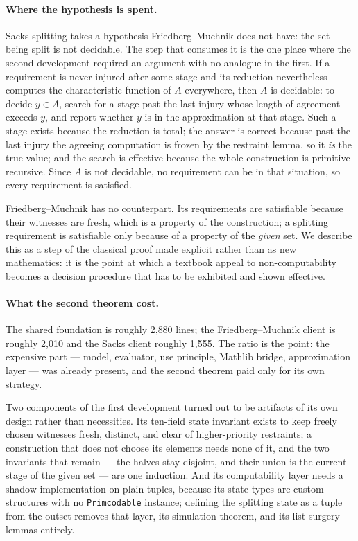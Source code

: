 \paragraph{Where the hypothesis is spent.}
Sacks splitting takes a hypothesis Friedberg--Muchnik does not have: the
set being split is not decidable.  The step that consumes it is the one
place where the second development required an argument with no analogue in
the first.  If a requirement is never injured after some stage and its
reduction nevertheless computes the characteristic function of $A$
everywhere, then $A$ is decidable: to decide $y \in A$, search for a stage
past the last injury whose length of agreement exceeds $y$, and report
whether $y$ is in the approximation at that stage.  Such a stage exists
because the reduction is total; the answer is correct because past the last
injury the agreeing computation is frozen by the restraint lemma, so it
\emph{is} the true value; and the search is effective because the whole
construction is primitive recursive.  Since $A$ is not decidable, no
requirement can be in that situation, so every requirement is satisfied.

Friedberg--Muchnik has no counterpart.  Its requirements are satisfiable
because their witnesses are fresh, which is a property of the construction;
a splitting requirement is satisfiable only because of a property of the
\emph{given} set.  We describe this as a step of the classical proof made
explicit rather than as new mathematics: it is the point at which a
textbook appeal to non-computability becomes a decision procedure that has
to be exhibited and shown effective.

\paragraph{What the second theorem cost.}
The shared foundation is roughly 2{,}880 lines; the Friedberg--Muchnik
client is roughly 2{,}010 and the Sacks client roughly 1{,}555.  The ratio
is the point: the expensive part --- model, evaluator, use principle,
Mathlib bridge, approximation layer --- was already present, and the second
theorem paid only for its own strategy.

Two components of the first development turned out to be artifacts of its
own design rather than necessities.  Its ten-field state invariant exists
to keep freely chosen witnesses fresh, distinct, and clear of
higher-priority restraints; a construction that does not choose its
elements needs none of it, and the two invariants that remain --- the
halves stay disjoint, and their union is the current stage of the given set
--- are one induction.  And its computability layer needs a shadow
implementation on plain tuples, because its state types are custom
structures with no \texttt{Primcodable} instance; defining the splitting
state as a tuple from the outset removes that layer, its simulation
theorem, and its list-surgery lemmas entirely.

